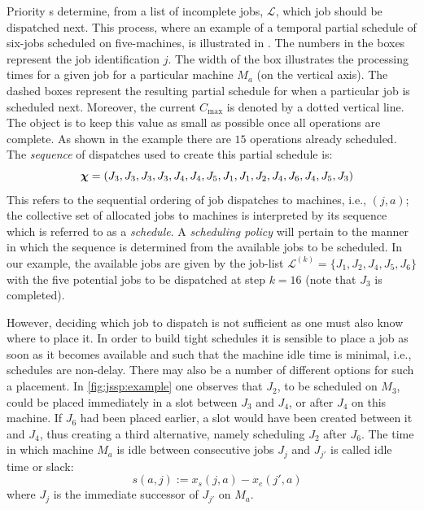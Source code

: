 \documentclass[twocolumn]{svjour3}
\begin{document}
Priority \dr s determine, from a list of incomplete jobs, 
$\mathcal{L}$, which job should be dispatched next. This process, where an 
example of 
a temporal partial schedule of six-jobs scheduled on five-machines, is 
illustrated in  .
The numbers in the boxes represent the job identification $j$. 
The width of the box illustrates the processing times for a given job for a 
particular machine $M_a$ (on the vertical axis). 
The dashed boxes represent the resulting partial schedule for when a particular 
job is scheduled next. 
Moreover, the current $C_{\max}$ is denoted by a dotted vertical line. 
The object is to keep this value as small as possible once all operations are 
complete. As shown in the example there are $15$ operations already scheduled. 
The \textit{sequence} of dispatches used to create this partial schedule is:
\begin{equation}\quad
\bm \chi=\left(J_3,J_3,J_3,J_3,J_4,J_4,J_5,J_1,J_1,J_2,J_4,J_6,J_4,J_5,J_3\right)
\end{equation}
This refers to the sequential ordering of job dispatches to machines, i.e., 
$(j,a)$; 
the collective set of allocated jobs to machines is interpreted by its 
sequence which is referred to as a \emph{schedule}.
A \emph{scheduling policy} will pertain to the manner in which 
the sequence is determined from the available jobs to be scheduled. 
In our example, the available jobs are given by the job-list
$\mathcal{L}^{(k)}=\{J_1,J_2,J_4,J_5,J_6\}$ with the five potential jobs 
to be dispatched at step $k=16$ (note that $J_3$ is completed).

However, deciding which job to dispatch is not sufficient as one must also know 
where to place it. In order to build tight schedules it is sensible to place a 
job as soon as it becomes available and such that the machine idle time is 
minimal, i.e., schedules are non-delay. 
There may also be a number of different options for such a placement. 
In \cref{fig:jssp:example} one observes that $J_2$, to be scheduled on $M_3$, 
could be placed immediately in a slot between $J_3$ and $J_4$, or after $J_4$ 
on this machine. 
If $J_6$ had been placed earlier, a slot would have been created between it and 
$J_4$, thus creating a third alternative, namely scheduling $J_2$ after $J_6$. 
The time in which machine $M_a$ is idle between consecutive jobs $J_j$ and 
$J_{j'}$ is called idle time or slack:
\begin{equation}\quad 
s(a,j):=x_s(j,a)-x_e(j',a) \label{eq:slack}
\end{equation}
where $J_j$ is the immediate successor of $J_{j'}$ on $M_a$. 
\end{document}
